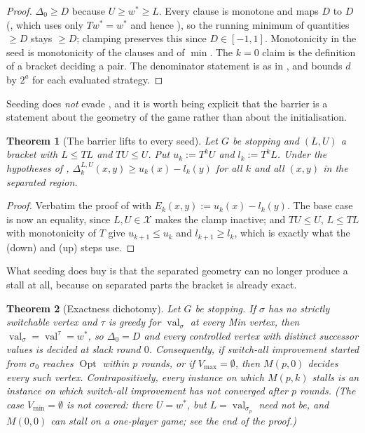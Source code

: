 \documentclass[11pt]{article}
\theoremstyle{plain}
\newtheorem{theorem}{Theorem}[section]
\theoremstyle{definition}
\DeclareMathOperator{\val}{val}
\DeclareMathOperator{\Opt}{Opt}
\newcommand{\Vmax}{V_{\max}}
\newcommand{\Vmin}{V_{\min}}
\begin{document}
\begin{proof}
$\Delta_0\ge D$ because $U\ge w^\ast\ge L$. Every clause is monotone and
maps $D$ to $D$ (, which uses only $Tw^\ast=w^\ast$
and hence ), so the running minimum of quantities
$\ge D$ stays $\ge D$; clamping preserves this since $D\in[-1,1]$.
Monotonicity in the seed is monotonicity of the clauses and of $\min$.
The $k=0$ claim is the definition of a bracket deciding a pair. The
denominator statement is as in , and
 bounds $d$ by $2^{a}$ for each evaluated
strategy.
\end{proof}

Seeding does \emph{not} evade , and it is worth
being explicit that the barrier is a statement about the geometry of the
game rather than about the initialisation.

\begin{theorem}[The barrier lifts to every seed]\label{thm:seeded-barrier}
Let $G$ be stopping and $(L,U)$ a bracket with $L\le TL$ and $TU\le U$.
Put $u_k:=T^{k}U$ and $l_k:=T^{k}L$. Under the hypotheses of
, $\Delta^{L,U}_k(x,y)\ge u_k(x)-l_k(y)$ for all
$k$ and all $(x,y)$ in the separated region.
\end{theorem}

\begin{proof}
Verbatim the proof of  with
$E_k(x,y):=u_k(x)-l_k(y)$. The base case is now an equality, since
$L,U\in\mathcal{X}$ makes the clamp inactive; and $TU\le U$, $L\le TL$
with monotonicity of $T$ give $u_{k+1}\le u_k$ and $l_{k+1}\ge l_k$,
which is exactly what the (down) and (up) steps use.
\end{proof}

What seeding does buy is that the separated geometry can no longer
produce a stall at all, because on separated parts the bracket is already
exact.

\begin{theorem}[Exactness dichotomy]\label{thm:seed-dichotomy}
Let $G$ be stopping. If $\sigma$ has no strictly switchable vertex and
$\tau$ is greedy for $\val_\sigma$ at every Min vertex, then
$\val_\sigma=\val^\tau=w^\ast$, so $\Delta_0=D$ and every controlled
vertex with distinct successor values is decided at slack round $0$.
Consequently, if switch-all improvement started from $\sigma_0$ reaches
$\Opt$ within $p$ rounds, or if $\Vmax=\emptyset$, then $M(p,0)$ decides
every such vertex. Contrapositively, every instance on which $M(p,k)$
stalls is an instance on which switch-all improvement has \emph{not}
converged after $p$ rounds. (The case $\Vmin=\emptyset$ is \emph{not}
covered: there $U=w^\ast$, but $L=\val_{\sigma_p}$ need not be, and
$M(0,0)$ can stall on a one-player game; see the end of the proof.)
\end{theorem}
\end{document}
